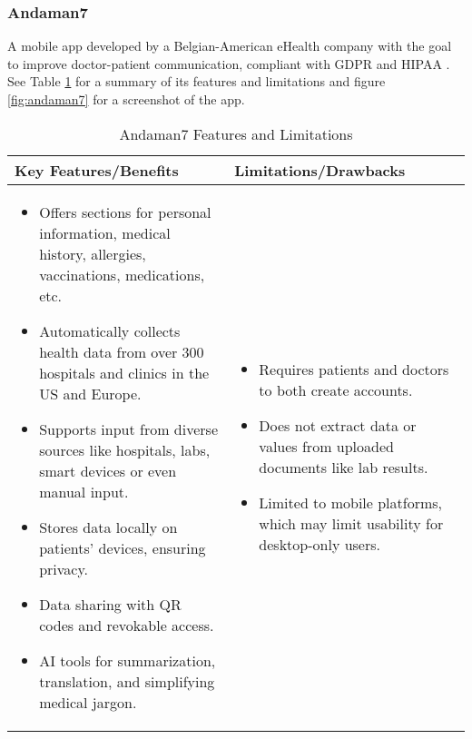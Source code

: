 \FloatBarrier

\subsubsection{Andaman7}

A mobile app developed by a Belgian-American eHealth company with the goal to improve doctor-patient communication, compliant with GDPR and HIPAA \parencite{andaman}. See Table \ref{tab:andaman7} for a summary of its features and limitations and figure \ref{fig:andaman7} for a screenshot of the app.

\begin{table}[htbp]
\centering
    \begin{tabular}{|p{}|p{}|}
    \hline
    \textbf{Key Features/Benefits} & \textbf{Limitations/Drawbacks} \\ \hline
    \begin{itemize}
        \item Offers sections for personal information, medical history, allergies, vaccinations, medications, etc.
        \item Automatically collects health data from over 300 hospitals and clinics in the US and Europe.
        \item Supports input from diverse sources like hospitals, labs, smart devices or even manual input.
        \item Stores data locally on patients’ devices, ensuring privacy.
        \item Data sharing with QR codes and revokable access.
        \item AI tools for summarization, translation, and simplifying medical jargon.
    \end{itemize} &
    \begin{itemize}
        \item Requires patients and doctors to both create accounts.
        \item Does not extract data or values from uploaded documents like lab results.
        \item Limited to mobile platforms, which may limit usability for desktop-only users.
    \end{itemize} \\ \hline
    \end{tabular}
\caption{Andaman7 Features and Limitations}
\label{tab:andaman7}
\end{table}

\FloatBarrier
\clearpage

